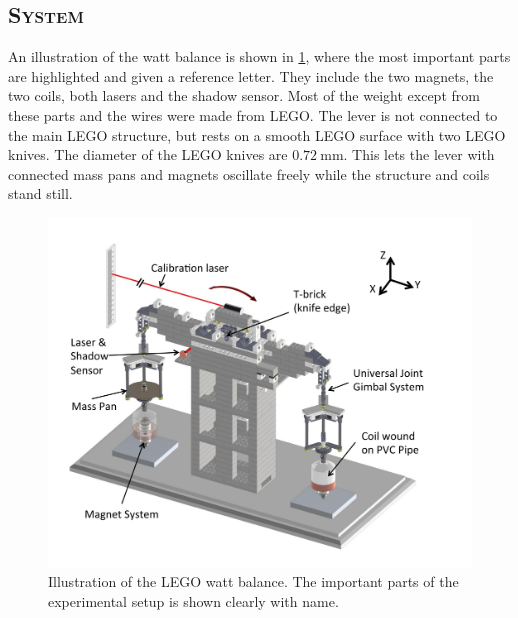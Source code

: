 \documentclass[english,a4paper,12pt,reprint]{revtex4-1}
\begin{document}
\subsection{\textsc{System}}
An illustration of the watt balance is shown in \cref{fig:watt_balance}, where the most important parts are highlighted and given a reference letter. They include the two magnets, the two coils, both lasers and the shadow sensor. Most of the weight except from these parts and the wires were made from LEGO. The lever is not connected to the main LEGO structure, but rests on a smooth LEGO surface with two LEGO knives. The diameter of the LEGO knives are $\SI{0.72}{\milli\meter}$. This lets the lever with connected mass pans and magnets oscillate freely while the structure and coils stand still.

\begin{figure}
  \centering
  \includegraphics[scale=0.37]{LEGO_watt_fig.png}
  \caption{Illustration of the LEGO watt balance. The important parts of the experimental setup is shown clearly with name.}
  \label{fig:watt_balance}
\end{figure}
\end{document}
